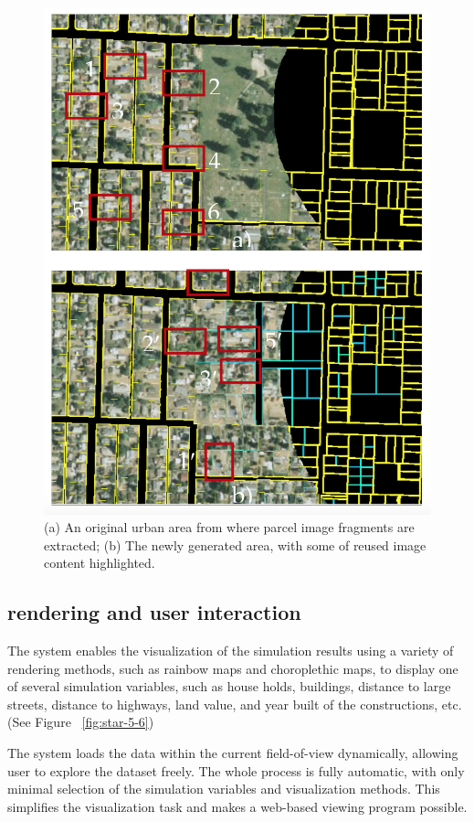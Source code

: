 \documentclass{egpubl}
\begin{document}
\begin{figure}[htb]
  \centering
  \includegraphics[width=.95\linewidth]{star-5-4}
  \caption{\label{fig:star-5-4} (a) An original urban area from where parcel image fragments are extracted; (b) The newly generated area, with some of reused image content highlighted.}
\end{figure}

\subsection{rendering and user interaction}
The system enables the visualization of the simulation results using a variety of rendering methods, such as rainbow maps and choroplethic maps, to display one of several simulation variables, such as house holds, buildings, distance to large streets, distance to highways, land value, and year built of the constructions, etc. (See Figure ~\ref{fig:star-5-6})

The system loads the data within the current field-of-view dynamically, allowing user to explore the dataset freely. The whole process is fully automatic, with only minimal selection of the simulation variables and visualization methods. This simplifies the visualization task and makes a web-based viewing program possible.
\end{document}
